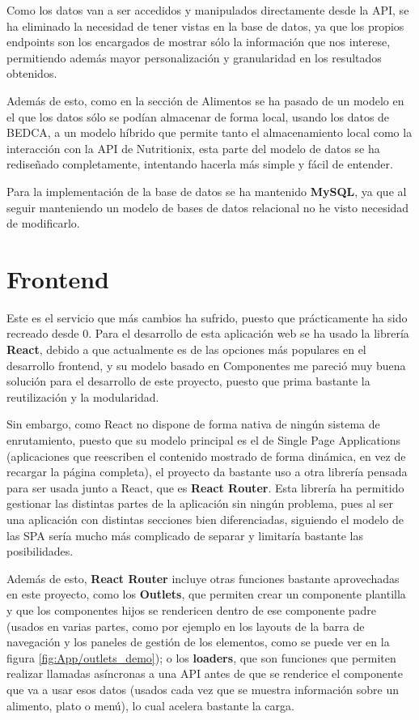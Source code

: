 Como los datos van a ser accedidos y manipulados directamente desde la API, se ha eliminado la necesidad de tener vistas en la base de datos, ya que los propios endpoints son los encargados de mostrar sólo la información que nos interese, permitiendo además mayor personalización y granularidad en los resultados obtenidos.

Además de esto, como en la sección de Alimentos se ha pasado de un modelo en el que los datos sólo se podían almacenar de forma local, usando los datos de BEDCA, a un modelo híbrido que permite tanto el almacenamiento local como la interacción con la API de Nutritionix, esta parte del modelo de datos se ha rediseñado completamente, intentando hacerla más simple y fácil de entender.


Para la implementación de la base de datos se ha mantenido \textbf{MySQL}, ya que al seguir manteniendo un modelo de bases de datos relacional no he visto necesidad de modificarlo.

\section{Frontend}

Este es el servicio que más cambios ha sufrido, puesto que prácticamente ha sido recreado desde 0. Para el desarrollo de esta aplicación web se ha usado la librería \textbf{React}, debido a que actualmente es de las opciones más populares en el desarrollo frontend, y su modelo basado en Componentes me pareció muy buena solución para el desarrollo de este proyecto, puesto que prima bastante la reutilización y la modularidad. 

Sin embargo, como React no dispone de forma nativa de ningún sistema de enrutamiento, puesto que su modelo principal es el de Single Page Applications (aplicaciones que reescriben el contenido mostrado de forma dinámica, en vez de recargar la página completa), el proyecto da bastante uso a otra librería pensada para ser usada junto a React, que es \textbf{React Router}. Esta librería ha permitido gestionar las distintas partes de la aplicación sin ningún problema, pues al ser una aplicación con distintas secciones bien diferenciadas, siguiendo el modelo de las SPA sería mucho más complicado de separar y limitaría bastante las posibilidades.

Además de esto, \textbf{React Router} incluye otras funciones bastante aprovechadas en este proyecto, como los \textbf{Outlets}, que permiten crear un componente plantilla y que los componentes hijos se rendericen dentro de ese componente padre (usados en varias partes, como por ejemplo en los layouts de la barra de navegación y los paneles de gestión de los elementos, como se puede ver en la figura \ref{fig:App/outlets_demo}); o los \textbf{loaders}, que son funciones que permiten realizar llamadas asíncronas a una API antes de que se renderice el componente que va a usar esos datos (usados cada vez que se muestra información sobre un alimento, plato o menú), lo cual acelera bastante la carga.

